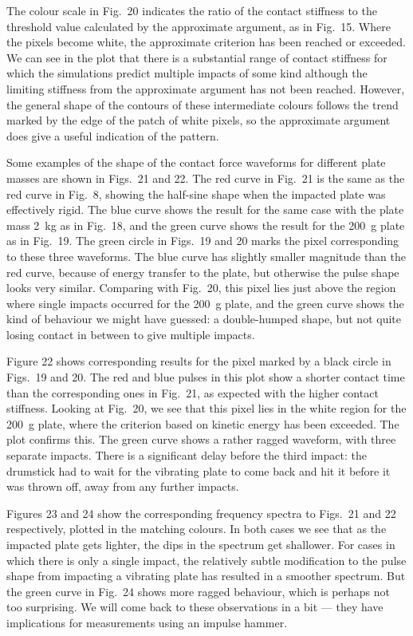   The colour scale in Fig.\ 20 indicates the ratio of the contact stiffness to 
  the threshold value calculated by the approximate argument, as in Fig.\ 15. 
  Where the pixels become white, the approximate criterion has been reached or 
  exceeded. We can see in the plot that there is a substantial range of contact 
  stiffness for which the simulations predict multiple impacts of some kind 
  although the limiting stiffness from the approximate argument has not been 
  reached. However, the general shape of the contours of these intermediate 
  colours follows the trend marked by the edge of the patch of white pixels, so 
  the approximate argument does give a useful indication of the pattern. 

  Some examples of the shape of the contact force waveforms for different plate 
  masses are shown in Figs.\ 21 and 22. The red curve in Fig.\ 21 is the same 
  as the red curve in Fig.\ 8, showing the half-sine shape when the impacted 
  plate was effectively rigid. The blue curve shows the result for the same 
  case with the plate mass 2~kg as in Fig.\ 18, and the green curve shows the 
  result for the 200~g plate as in Fig.\ 19. The green circle in Figs.\ 19 and 
  20 marks the pixel corresponding to these three waveforms. The blue curve has 
  slightly smaller magnitude than the red curve, because of energy transfer to 
  the plate, but otherwise the pulse shape looks very similar. Comparing with 
  Fig.\ 20, this pixel lies just above the region where single impacts occurred 
  for the 200~g plate, and the green curve shows the kind of behaviour we might 
  have guessed: a double-humped shape, but not quite losing contact in between 
  to give multiple impacts. 

  Figure 22 shows corresponding results for the pixel marked by a black circle 
  in Figs.\ 19 and 20. The red and blue pulses in this plot show a shorter 
  contact time than the corresponding ones in Fig.\ 21, as expected with the 
  higher contact stiffness. Looking at Fig.\ 20, we see that this pixel lies in 
  the white region for the 200~g plate, where the criterion based on kinetic 
  energy has been exceeded. The plot confirms this. The green curve shows a 
  rather ragged waveform, with three separate impacts. There is a significant 
  delay before the third impact: the drumstick had to wait for the vibrating 
  plate to come back and hit it before it was thrown off, away from any further 
  impacts. 

  Figures 23 and 24 show the corresponding frequency spectra to Figs.\ 21 and 
  22 respectively, plotted in the matching colours. In both cases we see that 
  as the impacted plate gets lighter, the dips in the spectrum get shallower. 
  For cases in which there is only a single impact, the relatively subtle 
  modification to the pulse shape from impacting a vibrating plate has resulted 
  in a smoother spectrum. But the green curve in Fig.\ 24 shows more ragged 
  behaviour, which is perhaps not too surprising. We will come back to these 
  observations in a bit — they have implications for measurements using an 
  impulse hammer. 

